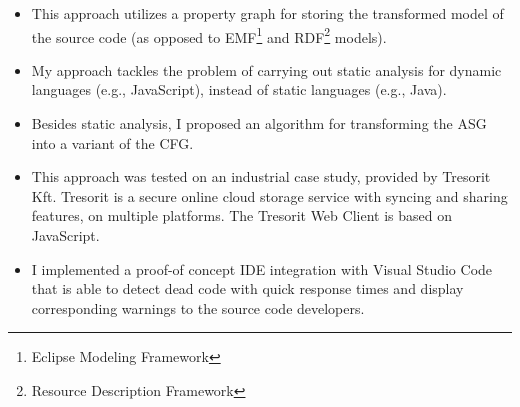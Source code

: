 \begin{itemize}[topsep=0pt]
	\item This approach utilizes a property graph for storing the transformed model of the source code (as opposed to EMF\footnote{Eclipse Modeling Framework} and RDF\footnote{Resource Description Framework} models).

	\item My approach tackles the problem of carrying out static analysis for dynamic languages (e.g., JavaScript), instead of static languages (e.g., Java).

	\item Besides static analysis, I proposed an algorithm for transforming the ASG into a variant of the CFG.

	\item This approach was tested on an industrial case study, provided by Tresorit Kft. Tresorit is a secure online cloud storage service with syncing and sharing features, on multiple platforms. The Tresorit Web Client is based on JavaScript.

	\item I implemented a proof-of concept IDE integration with Visual Studio Code that is able to detect dead code with quick response times and display corresponding warnings to the source code developers.
\end{itemize}
